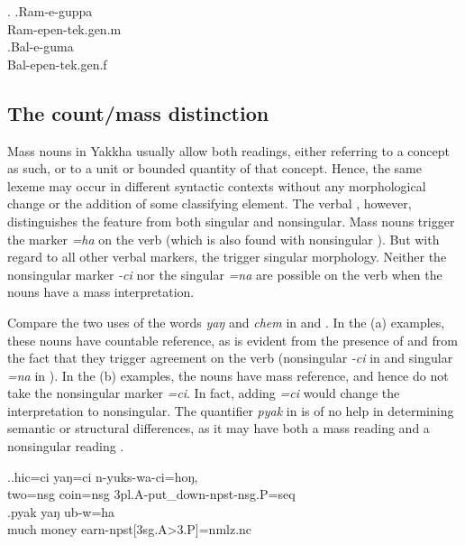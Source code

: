 \ex. \ag.Ram-e-guppa\\
		 Ram{\sc -epen-tek.gen.m}\\
 	\bg.Bal-e-guma\\
		Bal{\sc -epen-tek.gen.f}\\
	
\subsection{The count/mass distinction}\label{lex-noun-4}

Mass nouns in Yakkha usually allow both readings, either referring to a concept as such, or to a unit or bounded quantity of that concept. Hence, the same lexeme may occur in different syntactic contexts without any morphological change or the addition of some classifying element. The verbal , however, distinguishes the feature  from both singular and nonsingular. Mass nouns trigger the marker \emph{=ha} on the verb (which is also found with nonsingular ). But with regard to all other verbal markers, the  trigger singular morphology. Neither  the nonsingular marker \emph{-ci} nor the singular  \emph{=na} are possible on the verb when the nouns have a mass interpretation. 

Compare the two uses of the words \emph{yaŋ}   and \emph{chem}  in \Next and \NNext. In the (a) examples, these nouns have countable reference, as is evident from the presence of  and from the fact that they trigger  agreement on the verb (nonsingular \emph{-ci} in \Next[a] and singular \emph{=na} in \NNext[a]). In the (b) examples, the nouns have mass reference, and hence do not take the nonsingular marker \emph{=ci}.  In fact, adding \emph{=ci} would change the interpretation to nonsingular. The quantifier \emph{pyak} in \Next[b] is of no help in determining semantic or structural differences, as it may have both a mass reading  and a nonsingular reading .

\ex.\ag.hic=ci yaŋ=ci     n-yuks-wa-ci=hoŋ, \\
two{\sc =nsg} coin{\sc =nsg} {\sc 3pl.A-}put\_down{\sc -npst-nsg.P=seq}\\
  
\bg.pyak yaŋ ub-w=ha\\
much money earn{\sc -npst[3sg.A>3.P]=nmlz.nc}\\


